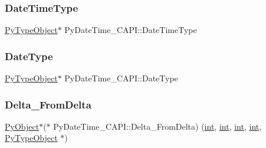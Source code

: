 \mbox{\label{struct_py_date_time___c_a_p_i_a85f29d980c43599949a37890882e5051}} 
\subsubsection{\texorpdfstring{DateTimeType}{DateTimeType}}
{\footnotesize\ttfamily \mbox{\hyperlink{_python27_2object_8h_a42a55dd6e973872c7a6bc61632070f6f}{Py\+Type\+Object}}$\ast$ Py\+Date\+Time\+\_\+\+C\+A\+P\+I\+::\+Date\+Time\+Type}

\mbox{\label{struct_py_date_time___c_a_p_i_abfafd0453a7f387ab8f4365431543905}} 
\subsubsection{\texorpdfstring{DateType}{DateType}}
{\footnotesize\ttfamily \mbox{\hyperlink{_python27_2object_8h_a42a55dd6e973872c7a6bc61632070f6f}{Py\+Type\+Object}}$\ast$ Py\+Date\+Time\+\_\+\+C\+A\+P\+I\+::\+Date\+Type}

\mbox{\label{struct_py_date_time___c_a_p_i_aeac28563c38854bbb88403ec237cf46a}} 
\subsubsection{\texorpdfstring{Delta\_FromDelta}{Delta\_FromDelta}}
{\footnotesize\ttfamily \mbox{\hyperlink{_python27_2object_8h_aadc84ac7aed2cfa6f20c25f62bf3dac7}{Py\+Object}}$\ast$($\ast$ Py\+Date\+Time\+\_\+\+C\+A\+P\+I\+::\+Delta\+\_\+\+From\+Delta) (\mbox{\hyperlink{warnings_8h_a74f207b5aa4ba51c3a2ad59b219a423b}{int}}, \mbox{\hyperlink{warnings_8h_a74f207b5aa4ba51c3a2ad59b219a423b}{int}}, \mbox{\hyperlink{warnings_8h_a74f207b5aa4ba51c3a2ad59b219a423b}{int}}, \mbox{\hyperlink{warnings_8h_a74f207b5aa4ba51c3a2ad59b219a423b}{int}}, \mbox{\hyperlink{_python27_2object_8h_a42a55dd6e973872c7a6bc61632070f6f}{Py\+Type\+Object}} $\ast$)}

